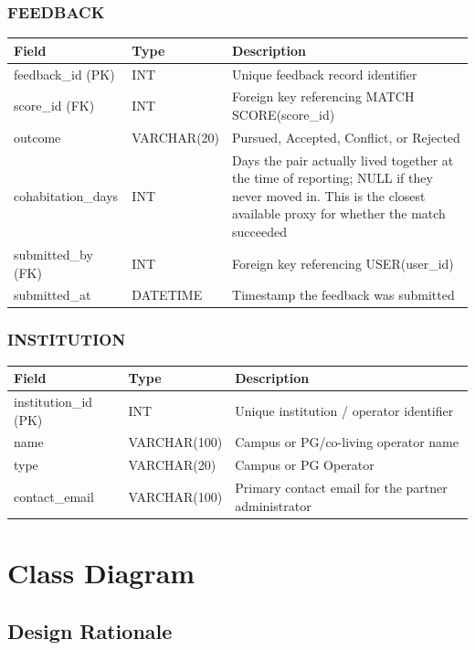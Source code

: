 \documentclass[12pt,a4paper]{report}
\begin{document}
\subsection*{FEEDBACK}
\begin{longtable}{L{3.2cm}L{2.5cm}L{8.5cm}}
\toprule
\textbf{Field} & \textbf{Type} & \textbf{Description} \\
\midrule
\endhead
feedback\_id (PK) & INT & Unique feedback record identifier \\
score\_id (FK) & INT & Foreign key referencing MATCH SCORE(score\_id) \\
outcome & VARCHAR(20) & Pursued, Accepted, Conflict, or Rejected \\
cohabitation\_days & INT & Days the pair actually lived together at the time of reporting; NULL if they never moved in. This is the closest available proxy for whether the match succeeded \\
submitted\_by (FK) & INT & Foreign key referencing USER(user\_id) \\
submitted\_at & DATETIME & Timestamp the feedback was submitted \\
\bottomrule
\end{longtable}

\subsection*{INSTITUTION}
\begin{longtable}{L{3.2cm}L{2.5cm}L{8.5cm}}
\toprule
\textbf{Field} & \textbf{Type} & \textbf{Description} \\
\midrule
\endhead
institution\_id (PK) & INT & Unique institution / operator identifier \\
name & VARCHAR(100) & Campus or PG/co-living operator name \\
type & VARCHAR(20) & Campus or PG Operator \\
contact\_email & VARCHAR(100) & Primary contact email for the partner administrator \\
\bottomrule
\end{longtable}

\chapter{Class Diagram}

\section{Design Rationale}
\end{document}
